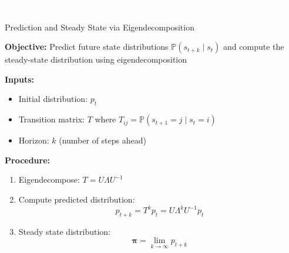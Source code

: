 \documentclass[11pt,table]{beamer}
\begin{document}
\appendix
{
\begin{frame}
\centering
\Huge
\textcolor{white}{Appendix}
\thispagestyle{empty}
\end{frame}
}



\begin{frame}{Prediction and Steady State via Eigendecomposition}

\textbf{Objective:} Predict future state distributions $\mathbb{P}(s_{t+k} \mid s_t)$ and compute the steady-state distribution using eigendecomposition

\vspace{1em}
\textbf{Inputs:}
\begin{itemize}
  \item Initial distribution: $p_t$
  \item Transition matrix: $T$ where $T_{ij} = \mathbb{P}(s_{t+1} = j \mid s_t = i)$
  \item Horizon: $k$ (number of steps ahead)
\end{itemize}

\vspace{1em}
\textbf{Procedure:}
\begin{enumerate}  
  \item Eigendecompose: $T = U \Lambda U^{-1}$
  \item Compute predicted distribution:
  \[
  p_{t+k} = T^k p_t = U \Lambda^k U^{-1} p_t
  \]
  \item Steady state distribution:
  \[
  \boldsymbol{\pi} = \lim_{k \to \infty} p_{t+k}
  \]
\end{enumerate}

\end{frame}
\end{document}
